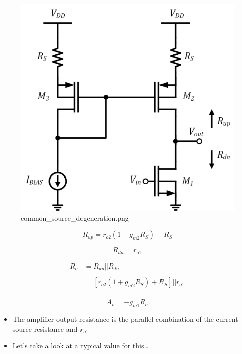 \documentclass[11pt]{article}
\providecommand{\tightlist}{%
      \setlength{\itemsep}{0pt}\setlength{\parskip}{0pt}}
\begin{document}
    \begin{figure}
\centering
\includegraphics{common_source_degeneration.png}
\caption{common\_source\_degeneration.png}
\end{figure}

    \begin{equation}
R_{up} = r_{o2}(1+g_{m2} R_S) + R_S
\end{equation}

\begin{equation}
R_{dn} = r_{o1}
\end{equation}

\begin{align}
R_o &= R_{up}||R_{dn}\\
\\
&= \left[r_{o2}(1+g_{m2} R_S) + R_S\right] || r_{o1} \\
\end{align}

\begin{equation}
\boxed{ A_v = -g_{m1}R_{o} }
\end{equation}

    \begin{itemize}
\tightlist
\item
  The amplifier output resistance is the parallel combination of the
  current source resistance and \(r_{o1}\)
\item
  Let's take a look at a typical value for this\ldots{}
\end{itemize}
\end{document}

